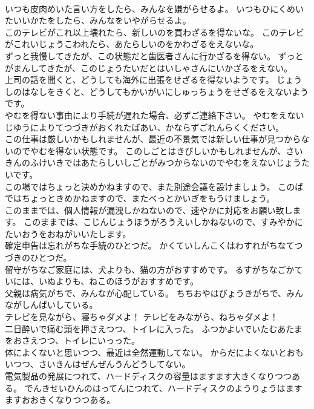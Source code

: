\documentclass[8pt]{extreport}
\begin{document}
\begin{CJK}{UTF8}{min}
\\	いつも皮肉めいた言い方をしたら、みんなを嫌がらせるよ。	いつもひにくめいたいいかたをしたら、みんなをいやがらせるよ。 
\\	このテレビがこれ以上壊れたら、新しいのを買わざるを得ないな。	このテレビがこれいじょうこわれたら、あたらしいのをかわざるをえないな。 
\\	ずっと我慢してきたが、この状態だと歯医者さんに行かざるを得ない。	ずっとがまんしてきたが、このじょうたいだとはいしゃさんにいかざるをえない。 
\\	上司の話を聞くと、どうしても海外に出張をせざるを得ないようです。	じょうしのはなしをきくと、どうしてもかいがいにしゅっちょうをせざるをえないようです。 
\\	やむを得ない事由により手続が遅れた場合、必ずご連絡下さい。	やむをえないじゆうによりてつづきがおくれたばあい、かならずごれんらくください。 
\\	この仕事は厳しいかもしれませんが、最近の不景気では新しい仕事が見つからないのでやむを得ない状態です。	このしごとはきびしいかもしれませんが、さいきんのふけいきではあたらしいしごとがみつからないのでやむをえないじょうたいです。 
\\	この場ではちょっと決めかねますので、また別途会議を設けましょう。	このばではちょっときめかねますので、またべっとかいぎをもうけましょう。 
\\	このままでは、個人情報が漏洩しかねないので、速やかに対応をお願い致します。	このままでは、こじんじょうほうがろうえいしかねないので、すみやかにたいおうをおねがいいたします。 
\\	確定申告は忘れがちな手続のひとつだ。	かくていしんこくはわすれがちなてつづきのひとつだ。 
\\	留守がちなご家庭には、犬よりも、猫の方がおすすめです。	るすがちなごかていには、いぬよりも、ねこのほうがおすすめです。 
\\	父親は病気がちで、みんなが心配している。	ちちおやはびょうきがちで、みんながしんぱいしている。 
\\	テレビを見ながら、寝ちゃダメよ！	テレビをみながら、ねちゃダメよ！ 
\\	二日酔いで痛む頭を押さえつつ、トイレに入った。	ふつかよいでいたむあたまをおさえつつ、トイレにいっった。 
\\	体によくないと思いつつ、最近は全然運動してない。	からだによくないとおもいつつ、さいきんはぜんぜんうんどうしてない。 
\\	電気製品の発展につれて、ハードディスクの容量はますます大きくなりつつある。	でんきせいひんのはってんにつれて、ハードディスクのようりょうはますますおおきくなりつつある。 

\end{CJK}
\end{document}
